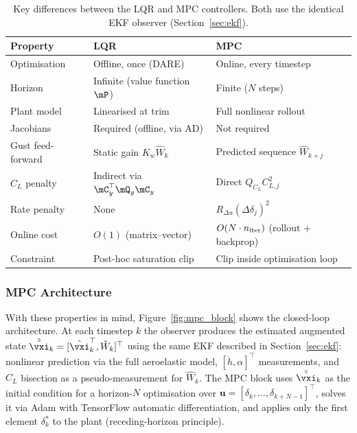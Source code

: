 \begin{table}[htbp]
\centering
\caption{Key differences between the LQR and MPC controllers.
         Both use the identical EKF observer (Section~\ref{sec:ekf}).}
\label{tab:lqr_vs_mpc}
\small
\begin{tabular}{lll}
\toprule
\textbf{Property} & \textbf{LQR} & \textbf{MPC} \\
\midrule
Optimisation      & Offline, once (DARE)          & Online, every timestep \\
Horizon           & Infinite (value function $\mP$) & Finite ($N$ steps) \\
Plant model       & Linearised at trim            & Full nonlinear rollout \\
Jacobians         & Required (offline, via AD)    & Not required \\
Gust feed-forward & Static gain $K_w\hat{W}_k$   & Predicted sequence $\hat{W}_{k+j}$ \\
$C_L$ penalty     & Indirect via $\mC_y^\top\mQ_y\mC_y$ & Direct $Q_{C_L}C_{L,j}^2$ \\
Rate penalty      & None                          & $R_{\Delta u}(\Delta\delta_j)^2$ \\
Online cost       & $O(1)$ (matrix--vector)       & $O(N\cdot n_{\rm iter})$ (rollout + backprop) \\
Constraint        & Post-hoc saturation clip      & Clip inside optimisation loop \\
\bottomrule
\end{tabular}
\end{table}

\subsubsection{MPC Architecture}
\label{sec:mpc_arch}

With these properties in mind, Figure~\ref{fig:mpc_block} shows the
closed-loop architecture.
At each timestep $k$ the observer produces the estimated augmented state
$\hat{\tilde{\vxi}}_k = [\hat{\vxi}_k^\top,\hat{W}_k]^\top$ using the
same EKF described in Section~\ref{sec:ekf}: nonlinear prediction via the
full aeroelastic model, $[\ddot{h},\alpha]^\top$ measurements, and $C_L$
bisection as a pseudo-measurement for $\hat{W}_k$.
The MPC block uses $\hat{\tilde{\vxi}}_k$ as the initial condition for a
horizon-$N$ optimisation over
$\mathbf{u} = [\delta_k, \ldots, \delta_{k+N-1}]^\top$,
solves it via Adam with TensorFlow automatic differentiation, and applies only
the first element $\delta_k^*$ to the plant (receding-horizon principle).

